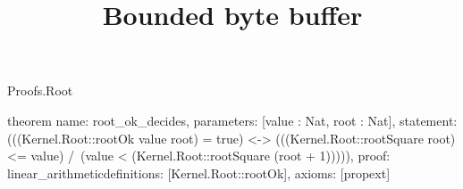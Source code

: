 \begin{lexlean}{Proofs.Root}
\title{Bounded byte buffer}
\begin{semanticmodule}
theorem{
  name: root_ok_decides,
  parameters: [value : Nat, root : Nat],
  statement: (((Kernel.Root::rootOk value root) = true) <-> (((Kernel.Root::rootSquare root) <= value) /\ (value < (Kernel.Root::rootSquare (root + 1))))),
  proof: linear_arithmetic{definitions: [Kernel.Root::rootOk]},
  axioms: [propext]
}
\end{semanticmodule}
\end{lexlean}
